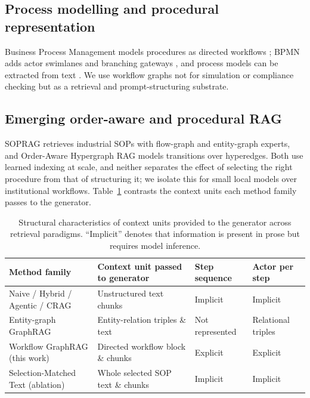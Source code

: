 \documentclass[a4paper,fleqn]{cas-dc}
\begin{document}
\subsection{Process modelling and procedural representation}
Business Process Management models procedures as directed workflows \cite{dumas2018fundamentals}; BPMN adds actor swimlanes and branching gateways \cite{omg2011bpmn}, and process models can be extracted from text \cite{friedrich2011process}. We use workflow graphs not for simulation or compliance checking but as a retrieval and prompt-structuring substrate.

\subsection{Emerging order-aware and procedural RAG}
SOPRAG \cite{lin2026sedrag} retrieves industrial SOPs with flow-graph and entity-graph experts, and Order-Aware Hypergraph RAG \cite{wu2026okhrag} models transitions over hyperedges. Both use learned indexing at scale, and neither separates the effect of selecting the right procedure from that of structuring it; we isolate this for small local models over institutional workflows. Table~\ref{tab:positioning} contrasts the context units each method family passes to the generator.

\begin{table}[!t]
\centering
\caption{Structural characteristics of context units provided to the generator across retrieval paradigms. ``Implicit'' denotes that information is present in prose but requires model inference.}
\label{tab:positioning}
\small
\begin{tabularx}{\textwidth}{>{\raggedright\arraybackslash}p{3.2cm} >{\raggedright\arraybackslash}X >{\raggedright\arraybackslash}p{2.1cm} >{\raggedright\arraybackslash}p{2.1cm}}
\toprule
Method family & Context unit passed to generator & Step sequence & Actor per step \\
\midrule
Naive / Hybrid / Agentic / CRAG \cite{lewis2020rag,cormack2009rrf,yao2023react,yan2024crag} & Unstructured text chunks & Implicit & Implicit \\
Entity-graph GraphRAG \cite{edge2024graphrag,guo2024lightrag} & Entity-relation triples \& text & Not represented & Relational triples \\
Workflow GraphRAG (this work) & Directed workflow block \& chunks & Explicit & Explicit \\
Selection-Matched Text (ablation) & Whole selected SOP text \& chunks & Implicit & Implicit \\
\bottomrule
\end{tabularx}
\end{table}
\end{document}
